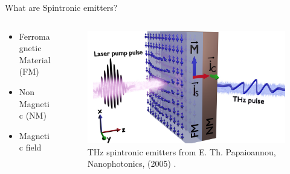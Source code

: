 \documentclass[aspectratio=1610, 9pt]{beamer}
\begin{document}
\begin{frame}{What are Spintronic emitters?}
  \begin{columns}
    \begin{column}{0.3\textwidth}
      \begin{itemize}
        \item Ferromagnetic Material (FM)
        \vspace{0.3in}
        \item Non Magnetic (NM)
        \vspace{0.3in}
        \item Magnetic field
      \end{itemize}
    \end{column}
    \begin{column}{.6\textwidth}
      \begin{figure}
      \includegraphics[width=\textwidth]{pics/emitter.png}
        \caption{\textcolor{tugreen}{THz spintronic emitters} from E. Th. Papaioannou, Nanophotonics, (2005) .}
        \nocite{gruytersbook}
      \end{figure}
    \end{column}
  \end{columns}
\end{frame}
\end{document}
